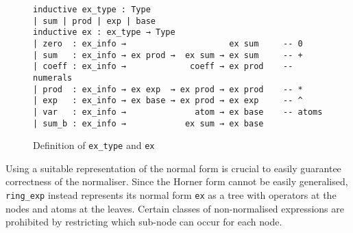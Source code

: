 \documentclass{llncs}
\newcommand{\lean}[1]{\texttt{#1}\xspace} %
\newcommand{\ex}{\lean{ex}}
\newcommand{\ring}{\lean{ring}}
\newcommand{\ringexp}{\lean{ring\_exp}}
\begin{document}

\begin{figure}
\begin{lstlisting}
inductive ex_type : Type
| sum | prod | exp | base
inductive ex : ex_type → Type
| zero  : ex_info →                     ex sum     -- 0
| sum   : ex_info → ex prod →  ex sum → ex sum     -- +
| coeff : ex_info →             coeff → ex prod    -- numerals
| prod  : ex_info → ex exp  → ex prod → ex prod    -- *
| exp   : ex_info → ex base → ex prod → ex exp     -- ^
| var   : ex_info →              atom → ex base    -- atoms
| sum_b : ex_info →            ex sum → ex base
\end{lstlisting}
\caption{Definition of \lean{ex\_type} and \ex}
\label{fig:def_ex}
\end{figure}
Using a suitable representation of the normal form is crucial to easily guarantee correctness of the normaliser.
Since the Horner form cannot be easily generalised,
\ringexp instead represents its normal form \ex as a tree with operators at the nodes and atoms at the leaves.
Certain classes of non-normalised expressions are prohibited by restricting which sub-node can occur for each node.
\end{document}
